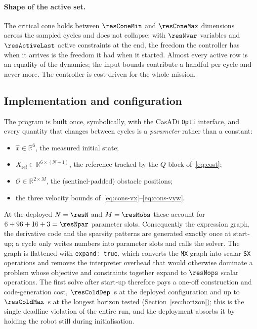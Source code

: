 \documentclass[11pt,a4paper]{article}
\newcommand{\R}{\mathbb{R}}
\begin{document}
\paragraph{Shape of the active set.} The critical cone holds between
$\resConeMin$ and $\resConeMax$ dimensions across the sampled cycles and does not collapse: with $\resNvar$ variables and $\resActiveLast$ active
constraints at the end, the freedom the controller has when it arrives is the freedom it had when it
started. Almost every active row is an equality of the dynamics; the input bounds contribute a handful per
cycle and never more. The controller is cost-driven for the whole mission.

\subsection{Implementation and configuration}
\label{sec:impl}

The program is built once, symbolically, with the CasADi \texttt{Opti} interface, and every quantity that
changes between cycles is a \emph{parameter} rather than a constant:
\begin{itemize}\itemsep2pt
  \item $\hat x\in\R^{6}$, the measured initial state;
  \item $X_{\mathrm{ref}}\in\R^{6\times(N+1)}$, the reference tracked by the $Q$ block of~\eqref{eq:cost};
  \item $\mathcal{O}\in\R^{2\times M}$, the (sentinel-padded) obstacle positions;
  \item the three velocity bounds of~\eqref{eq:cons-vx}--\eqref{eq:cons-vyw}.
\end{itemize}
At the deployed $N=\resN$ and $M=\resMobs$ these account for $6+96+16+3=\resNpar$ parameter slots.
Consequently the expression graph, the derivative code and the sparsity patterns are generated exactly once at
start-up; a cycle only writes numbers into parameter slots and calls the solver. The graph is flattened with
\texttt{expand:\,true}, which converts the \texttt{MX} graph into scalar \texttt{SX} operations and removes
the interpreter overhead that would otherwise dominate a problem whose objective and constraints together
expand to $\resNops$ scalar operations. The first solve after start-up therefore pays a one-off construction
and code-generation cost, $\resColdDep$~s at the deployed configuration and up to $\resColdMax$~s at the
longest horizon tested (Section~\ref{sec:horizon}); this is the single deadline violation of the entire run,
and the deployment absorbs it by holding the robot still during initialisation.
\end{document}
